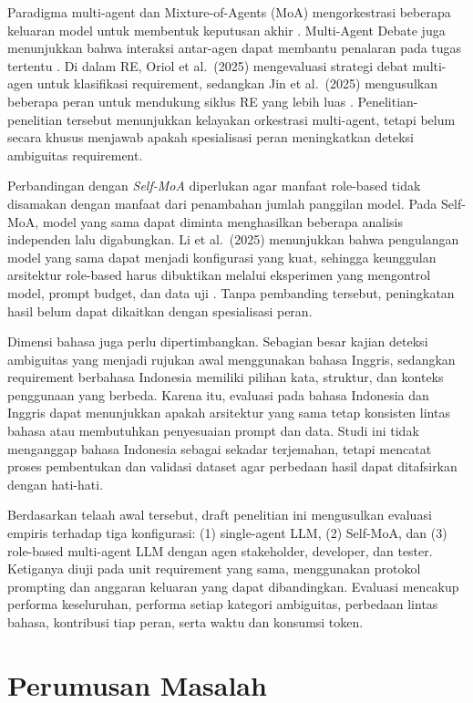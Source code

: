 Paradigma multi-agent dan Mixture-of-Agents (MoA) mengorkestrasi beberapa keluaran model untuk membentuk keputusan akhir \cite{wang2024moa}. Multi-Agent Debate juga menunjukkan bahwa interaksi antar-agen dapat membantu penalaran pada tugas tertentu \cite{du2023}. Di dalam RE, Oriol et al.\ (2025) mengevaluasi strategi debat multi-agen untuk klasifikasi requirement, sedangkan Jin et al.\ (2025) mengusulkan beberapa peran untuk mendukung siklus RE yang lebih luas \cite{oriol2025,jin2025}. Penelitian-penelitian tersebut menunjukkan kelayakan orkestrasi multi-agent, tetapi belum secara khusus menjawab apakah spesialisasi peran meningkatkan deteksi ambiguitas requirement.

Perbandingan dengan \textit{Self-MoA} diperlukan agar manfaat role-based tidak disamakan dengan manfaat dari penambahan jumlah panggilan model. Pada Self-MoA, model yang sama dapat diminta menghasilkan beberapa analisis independen lalu digabungkan. Li et al.\ (2025) menunjukkan bahwa pengulangan model yang sama dapat menjadi konfigurasi yang kuat, sehingga keunggulan arsitektur role-based harus dibuktikan melalui eksperimen yang mengontrol model, prompt budget, dan data uji \cite{lismoa2025}. Tanpa pembanding tersebut, peningkatan hasil belum dapat dikaitkan dengan spesialisasi peran.

Dimensi bahasa juga perlu dipertimbangkan. Sebagian besar kajian deteksi ambiguitas yang menjadi rujukan awal menggunakan bahasa Inggris, sedangkan requirement berbahasa Indonesia memiliki pilihan kata, struktur, dan konteks penggunaan yang berbeda. Karena itu, evaluasi pada bahasa Indonesia dan Inggris dapat menunjukkan apakah arsitektur yang sama tetap konsisten lintas bahasa atau membutuhkan penyesuaian prompt dan data. Studi ini tidak menganggap bahasa Indonesia sebagai sekadar terjemahan, tetapi mencatat proses pembentukan dan validasi dataset agar perbedaan hasil dapat ditafsirkan dengan hati-hati.

Berdasarkan telaah awal tersebut, draft penelitian ini mengusulkan evaluasi empiris terhadap tiga konfigurasi: (1) single-agent LLM, (2) Self-MoA, dan (3) role-based multi-agent LLM dengan agen stakeholder, developer, dan tester. Ketiganya diuji pada unit requirement yang sama, menggunakan protokol prompting dan anggaran keluaran yang dapat dibandingkan. Evaluasi mencakup performa keseluruhan, performa setiap kategori ambiguitas, perbedaan lintas bahasa, kontribusi tiap peran, serta waktu dan konsumsi token.

\section{Perumusan Masalah}

